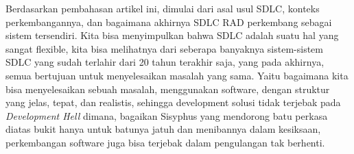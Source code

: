 \thispagestyle{plain}
Berdasarkan pembahasan artikel ini, dimulai dari asal usul SDLC, konteks perkembangannya,
dan bagaimana akhirnya SDLC RAD perkembang sebagai sistem tersendiri. Kita bisa menyimpulkan bahwa
SDLC adalah suatu hal yang sangat flexible, kita bisa melihatnya dari seberapa banyaknya sistem-sistem
SDLC yang sudah terlahir dari 20 tahun terakhir saja, yang pada akhirnya, semua bertujuan untuk menyelesaikan
masalah yang sama. Yaitu bagaimana kita bisa menyelesaikan sebuah masalah, menggunakan software,
dengan struktur yang jelas, tepat, dan realistis, sehingga development solusi tidak terjebak pada
\emph{Development Hell} dimana, bagaikan Sisyphus yang mendorong batu perkasa diatas bukit hanya untuk batunya jatuh
dan menibannya dalam kesiksaan, perkembangan software juga bisa terjebak dalam pengulangan tak berhenti.